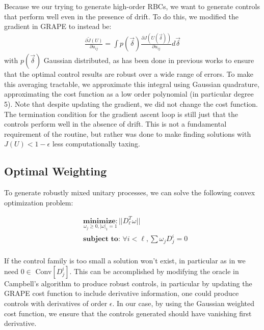 \documentclass[aps,nofootinbib,pra,notitlepage,twocolumn]{revtex4-1}
\begin{document}
Because we our trying to generate high-order RBCs, we want to generate controls that perform well even in the presence of drift. To do this, we modified the gradient in GRAPE to instead be:
\begin{align}\label{eq:quadrature}
\frac{\partial \tilde J(U)}{\partial u_{ij}} =
\int p(\vec{\delta})\frac{\partial J(U(\vec{\delta}))}{\partial u_{ij}} d\vec{\delta}
\end{align}
with $p(\vec{\delta})$ Gaussian distributed, as has been done in previous works \cite{Goerz2014} to ensure that the optimal control results are robust over a wide range of errors. To make this averaging tractable, we approximate this integral using Gaussian quadrature, approximating the cost function as a low order polynomial\cite{abramowiz1972handbook} (in particular degree 5). Note that despite updating the gradient, we did not change the cost function. The termination condition for the gradient ascent loop is still just that the controls perform well in the absence of drift. This is not a fundamental requirement of the routine, but rather was done to make finding solutions with $J(U) < 1 - \epsilon$  less computationally taxing.

\subsection{Optimal Weighting}
To generate robustly mixed unitary processes, we can solve the following convex optimization problem:

\begin{equation}\label{eq:minimization}
  \begin{split}
    &\underset{\omega_j\geq0, |\omega|_1=1}{\textbf{minimize}: } ||D_{\ell}^T\omega||\\
    &\textbf{subject to: } \forall i<\ell, \sum \omega_jD_j^i=0\\
  \end{split}
\end{equation}

If the control family is too small a solution won't exist, in particular as in \cite{Campbell2017} we need  $0\in $ Conv$[D_j^i]$.  This can be accomplished by modifying the oracle in Campbell's algorithm to produce robust controls, in particular by updating the GRAPE cost function to include derivative information, one could produce controls with derivatives of order $\epsilon$. In our case, by using the Gaussian weighted cost function, we ensure that the controls generated should have vanishing first derivative.
\end{document}
